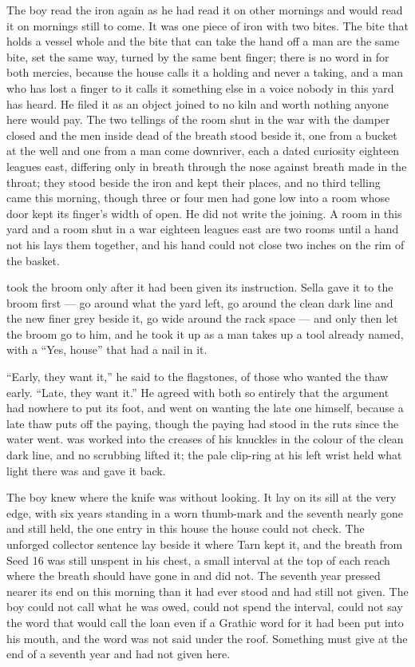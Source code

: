 The boy read the iron again as he had read it on other mornings and would read it on mornings still to come. It was one piece of iron with two bites. The bite that holds a vessel whole and the bite that can take the hand off a man are the same bite, set the same way, turned by the same bent finger; there is no word in  for both mercies, because the house calls it a holding and never a taking, and a man who has lost a finger to it calls it something else in a voice nobody in this yard has heard. He filed it as an object joined to no kiln and worth nothing anyone here would pay. The two tellings of the room shut in the war with the damper closed and the men inside dead of the breath stood beside it, one from a bucket at the well and one from a man come downriver, each a dated curiosity eighteen leagues east, differing only in breath through the nose against breath made in the throat; they stood beside the iron and kept their places, and no third telling came this morning, though three or four men had gone low into a room whose door kept its finger's width of open. He did not write the joining. A room in this yard and a room shut in a war eighteen leagues east are two rooms until a hand not his lays them together, and his hand could not close two inches on the rim of the basket.

\scenebreak

 took the broom only after it had been given its instruction. Sella gave it to the broom first — go around what the yard left, go around the clean dark line and the new finer grey beside it, go wide around the rack space — and only then let the broom go to him, and he took it up as a man takes up a tool already named, with a “Yes, house” that had a nail in it.

“Early, they want it,” he said to the flagstones, of those who wanted the thaw early. “Late, they want it.” He agreed with both so entirely that the argument had nowhere to put its foot, and went on wanting the late one himself, because a late thaw puts off the paying, though the paying had stood in the ruts since the water went.  was worked into the creases of his knuckles in the colour of the clean dark line, and no scrubbing lifted it; the pale clip-ring at his left wrist held what light there was and gave it back.

The boy knew where the knife was without looking. It lay on its sill at the very edge, with six years standing in a worn thumb-mark and the seventh nearly gone and still held, the one entry in this house the house could not check. The unforged collector sentence lay beside it where Tarn kept it, and the breath from Seed 16 was still unspent in his chest, a small interval at the top of each reach where the breath should have gone in and did not. The seventh year pressed nearer its end on this morning than it had ever stood and had still not given. The boy could not call what he was owed, could not spend the interval, could not say the word that would call the loan even if a Grathic word for it had been put into his mouth, and the word was not said under the roof. Something must give at the end of a seventh year and had not given here.

